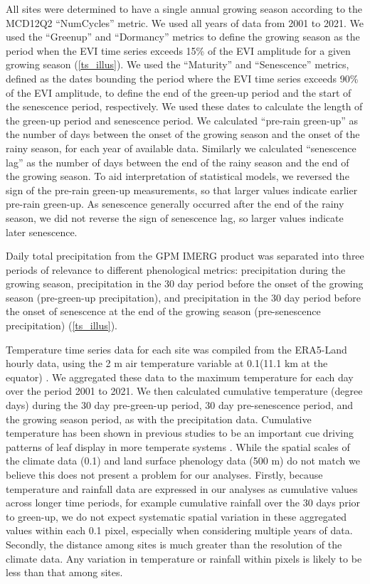 \documentclass[11pt,a4paper]{article}
\begin{document}
All sites were determined to have a single annual growing season according to
the MCD12Q2 ``NumCycles'' metric. We used all years of data from 2001 to 2021.
We used the ``Greenup'' and ``Dormancy'' metrics to define the growing season
as the period when the EVI time series exceeds 15\% of the EVI amplitude for a
given growing season (\autoref{ts_illus}). We used the ``Maturity'' and
``Senescence'' metrics, defined as the dates bounding the period where the EVI
time series exceeds 90\% of the EVI amplitude, to define the end of the
green-up period and the start of the senescence period, respectively. We used
these dates to calculate the length of the green-up period and senescence
period. We calculated ``pre-rain green-up'' as the number of days between the
onset of the growing season and the onset of the rainy season, for each year of
available data. Similarly we calculated ``senescence lag'' as the number of
days between the end of the rainy season and the end of the growing season. To
aid interpretation of statistical models, we reversed the sign of the pre-rain
green-up measurements, so that larger values indicate earlier pre-rain
green-up. As senescence generally occurred after the end of the rainy season,
we did not reverse the sign of senescence lag, so larger values indicate later
senescence. 

Daily total precipitation from the GPM IMERG product was separated into three
periods of relevance to different phenological metrics: precipitation during
the growing season, precipitation in the 30 day period before the onset of the
growing season (pre-green-up precipitation), and precipitation in the 30 day
period before the onset of senescence at the end of the growing season
(pre-senescence precipitation) (\autoref{ts_illus}). 

Temperature time series data for each site was compiled from the ERA5-Land
hourly data, using the 2 m air temperature variable at 0.1\textdegree (11.1 km
at the equator) \citep{ERA5}. We aggregated these data to the maximum
temperature for each day over the period 2001 to 2021. We then calculated
cumulative temperature (degree days) during the 30 day pre-green-up period, 30
day pre-senescence period, and the growing season period, as with the
precipitation data. Cumulative temperature has been shown in previous studies
to be an important cue driving patterns of leaf display in more temperate
systems \citep{Archibald2007, Michelson2017, Escamilla2020}. While the spatial
scales of the climate data (0.1\textdegree{}) and land surface phenology data
(500 m) do not match we believe this does not present a problem for our
analyses. Firstly, because temperature and rainfall data are expressed in our
analyses as cumulative values across longer time periods, for example
cumulative rainfall over the 30 days prior to green-up, we do not expect
systematic spatial variation in these aggregated values within each
0.1\textdegree{} pixel, especially when considering multiple years of data.
Secondly, the distance among sites is much greater than the resolution of the
climate data. Any variation in temperature or rainfall within pixels is likely
to be less than that among sites.
\end{document}
